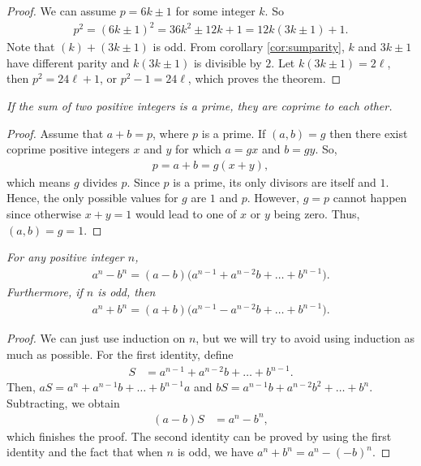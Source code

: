 \documentclass{subfile}
\begin{document}
	\begin{proof}
		We can assume $p=6k\pm1$ for some integer $k$. So
		\begin{align*}
			p^2 = (6k\pm1)^2 = 36k^2\pm12k+1 = 12k(3k\pm1)+1.
		\end{align*}
		Note that $(k)+(3k\pm1)$ is odd. From corollary \eqref{cor:sumparity}, $k$ and $3k\pm1$ have different parity and $k(3k\pm1)$ is divisible by $2$. Let $k(3k\pm1)=2\ell$, then $p^2=24\ell+1$, or $p^2-1=24\ell$, which proves the theorem.
	\end{proof}

	\begin{theorem}\slshape
		If the sum of two positive integers is a prime, they are coprime to each other.
	\end{theorem}

	\begin{proof}
		Assume that $a+b=p$, where $p$ is a prime. If $(a,b)=g$ then there exist coprime positive integers $x$ and $y$ for which $a=gx$ and $b=gy$. So,
		\begin{align*}
			p = a+b = g(x+y),
		\end{align*}
		which means $g$ divides $p$. Since $p$ is a prime, its only divisors are itself and $1$. Hence, the only possible values for $g$ are $1$ and $p$. However, $g=p$ cannot happen since otherwise $x+y=1$ would lead to one of $x$ or $y$ being zero. Thus, $(a,b)=g=1$.
	\end{proof}


	\begin{theorem}\slshape\label{id:fatandthin}
		For any positive integer $n$,
		\begin{align*}
			a^n-b^n=(a-b)\Big(a^{n-1}+a^{n-2}b+\dots+b^{n-1}\Big).
		\end{align*}
		Furthermore, if $n$ is odd, then
		\begin{align*}
			a^n+b^n=(a+b)\Big(a^{n-1}-a^{n-2}b+\dots+b^{n-1}\Big).
		\end{align*}
		\label{thm:powDiv}
	\end{theorem}
	\begin{proof}
		We can just use induction on $n$, but we will try to avoid using induction as much as possible. For the first identity, define
		\begin{align*}
			S & =a^{n-1}+a^{n-2}b+\dots+b^{n-1}.
		\end{align*}
		Then, $aS=a^n+a^{n-1}b+\dots+b^{n-1}a$ and $bS=a^{n-1}b+a^{n-2}b^2+\dots+b^n$. Subtracting, we obtain
		\begin{align*}
			(a-b)S & =a^n-b^n,
		\end{align*}
		which finishes the proof. The second identity can be proved by using the first identity and the fact that when $n$ is odd, we have $a^n+b^n=a^n-(-b)^n$.
	\end{proof}
\end{document}
